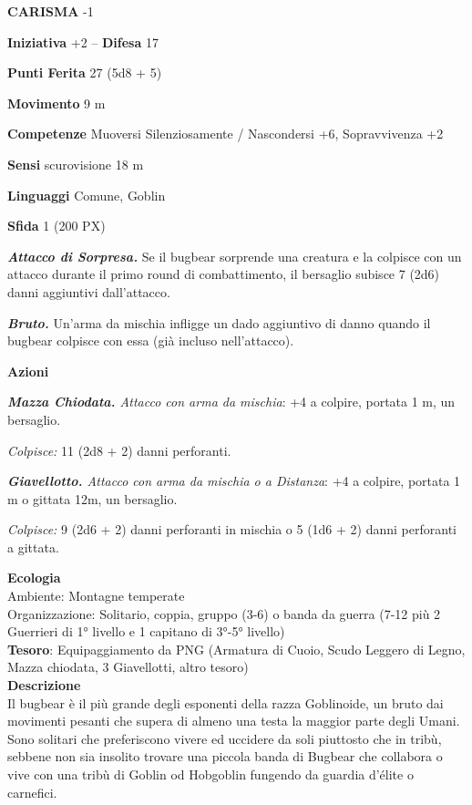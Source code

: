 \begin{multicols}{2}
	\textbf{CARISMA} -1

	\textbf{Iniziativa} +2 -- \textbf{Difesa} 17

	\textbf{Punti Ferita} 27 (5d8 + 5)

	\textbf{Movimento} 9 m

	\textbf{Competenze} Muoversi Silenziosamente / Nascondersi +6, Sopravvivenza +2

	\textbf{Sensi} scurovisione 18 m

	\textbf{Linguaggi} Comune, Goblin

	\textbf{Sfida} 1 (200 PX)

	\textit{\textbf{Attacco di Sorpresa.}} Se il bugbear sorprende una creatura e la colpisce con un attacco durante il primo round di combattimento, il bersaglio subisce 7 (2d6) danni aggiuntivi
	dall'attacco.

	\textit{\textbf{Bruto.}} Un'arma da mischia infligge un dado aggiuntivo di danno quando il bugbear colpisce con essa (già incluso nell'attacco).

	\textbf{Azioni}

	\textit{\textbf{Mazza Chiodata.} Attacco con arma da mischia}: +4 a colpire, portata 1 m, un bersaglio.

	\textit{Colpisce:} 11 (2d8 + 2) danni perforanti.

	\textit{\textbf{Giavellotto.} Attacco con arma da mischia o a Distanza}: +4 a colpire, portata 1 m o gittata 12m, un bersaglio.

	\textit{Colpisce:} 9 (2d6 + 2) danni perforanti in mischia o 5 (1d6 + 2) danni perforanti a gittata.

	\textbf{Ecologia}\\
	Ambiente: Montagne temperate\\
	Organizzazione: Solitario, coppia, gruppo (3-6) o banda da guerra (7-12 più 2 Guerrieri di 1° livello e 1 capitano di 3°-5° livello)\\
	\textbf{Tesoro}: Equipaggiamento da PNG (Armatura di Cuoio, Scudo Leggero di Legno, Mazza chiodata, 3 Giavellotti, altro tesoro)\\
	\textbf{Descrizione}\\
	Il bugbear è il più grande degli esponenti della razza Goblinoide, un bruto dai movimenti pesanti che supera di almeno una testa la maggior parte degli Umani. Sono solitari che preferiscono vivere ed uccidere da soli piuttosto che in tribù, sebbene non sia insolito trovare una piccola banda di Bugbear che collabora o vive con una tribù di Goblin od Hobgoblin fungendo da guardia d'élite o carnefici.


\end{multicols}
